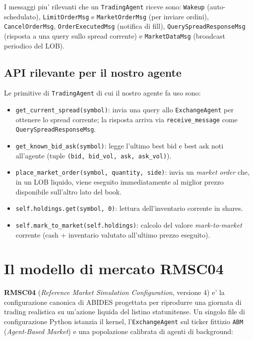 \documentclass[11pt,a4paper]{article}
\begin{document}
I messaggi piu' rilevanti che un \texttt{TradingAgent} riceve sono:
\texttt{Wakeup} (auto-schedulato), \texttt{LimitOrderMsg} e
\texttt{MarketOrderMsg} (per inviare ordini),
\texttt{CancelOrderMsg}, \texttt{OrderExecutedMsg} (notifica di
fill), \texttt{QuerySpreadResponseMsg} (risposta a una query sullo
spread corrente) e \texttt{MarketDataMsg} (broadcast periodico del
LOB).

\subsection{API rilevante per il nostro agente}

Le primitive di \texttt{TradingAgent} di cui il nostro agente fa
uso sono:
\begin{itemize}
    \item \texttt{get\_current\_spread(symbol)}: invia una query
          allo \texttt{ExchangeAgent} per ottenere lo spread
          corrente; la risposta arriva via \texttt{receive\_message}
          come \texttt{QuerySpreadResponseMsg}.
    \item \texttt{get\_known\_bid\_ask(symbol)}: legge l'ultimo
          best bid e best ask noti all'agente (tuple
          \texttt{(bid, bid\_vol, ask, ask\_vol)}).
    \item \texttt{place\_market\_order(symbol, quantity, side)}:
          invia un \emph{market order} che, in un LOB liquido,
          viene eseguito immediatamente al miglior prezzo
          disponibile sull'altro lato del book.
    \item \texttt{self.holdings.get(symbol, 0)}: lettura
          dell'inventario corrente in shares.
    \item \texttt{self.mark\_to\_market(self.holdings)}: calcolo
          del valore \emph{mark-to-market} corrente (cash +
          inventario valutato all'ultimo prezzo eseguito).
\end{itemize}

\section{Il modello di mercato RMSC04}
\label{sec:rmsc04}

\textbf{RMSC04} (\emph{Reference Market Simulation Configuration},
versione 4) e' la configurazione canonica di ABIDES progettata per
riprodurre una giornata di trading realistica su un'azione liquida
del listino statunitense.  Un singolo file di configurazione Python
istanzia il kernel, l'\texttt{ExchangeAgent} sul ticker fittizio
\texttt{ABM} (\emph{Agent-Based Market}) e una popolazione calibrata
di agenti di background:
\end{document}
